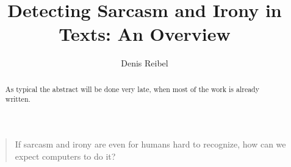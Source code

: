 \documentclass[sigconf,  review=false, nonacm=true]{acmart}
\begin{document}
\title{Detecting Sarcasm and Irony in Texts: An Overview}

\author{Denis Reibel}

\renewcommand{\shortauthors}{Denis Reibel}

\begin{abstract}
  As typical the abstract will be done very late, when most of the work is already written.
\end{abstract}


\begin{teaserfigure}
\vspace*{\fill} 
\begin{quote}
\centering 
\Large If sarcasm and irony are even for humans hard to recognize, how can we expect computers to do it?
\end{quote}
\vspace*{2 pt}
\end{teaserfigure}

\maketitle
\end{document}

